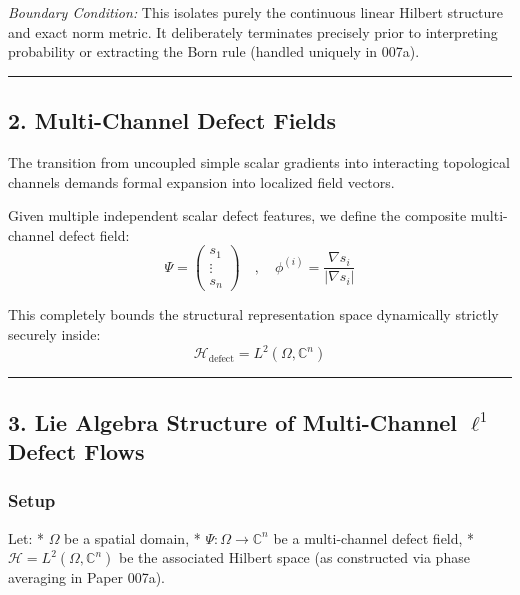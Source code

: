\documentclass[
]{article}
\begin{document}
\emph{Boundary Condition:} This isolates purely the continuous linear
Hilbert structure and exact norm metric. It deliberately terminates
precisely prior to interpreting probability or extracting the Born rule
(handled uniquely in 007a).

\begin{center}\rule{0.5\linewidth}{0.5pt}\end{center}

\subsection{2. Multi-Channel Defect
Fields}\label{multi-channel-defect-fields}

The transition from uncoupled simple scalar gradients into interacting
topological channels demands formal expansion into localized field
vectors.

Given multiple independent scalar defect features, we define the
composite multi-channel defect field:
\[ \Psi = \begin{pmatrix} s_1 \\ \vdots \\ s_n \end{pmatrix} \quad,\quad \phi^{(i)} = \frac{\nabla s_i}{|\nabla s_i|} \]

This completely bounds the structural representation space dynamically
strictly securely inside:
\[ \mathcal{H}_{\text{defect}} = L^2(\Omega, \mathbb{C}^n) \]

\begin{center}\rule{0.5\linewidth}{0.5pt}\end{center}

\subsection{\texorpdfstring{3. Lie Algebra Structure of Multi-Channel
\(\ell^1\) Defect
Flows}{3. Lie Algebra Structure of Multi-Channel \textbackslash ell\^{}1 Defect Flows}}\label{lie-algebra-structure-of-multi-channel-ell1-defect-flows}

\subsubsection{Setup}\label{setup}

Let: * \(\Omega\) be a spatial domain, *
\(\Psi : \Omega \to \mathbb{C}^n\) be a multi-channel defect field, *
\(\mathcal{H} = L^2(\Omega, \mathbb{C}^n)\) be the associated Hilbert
space (as constructed via phase averaging in Paper 007a).
\end{document}
